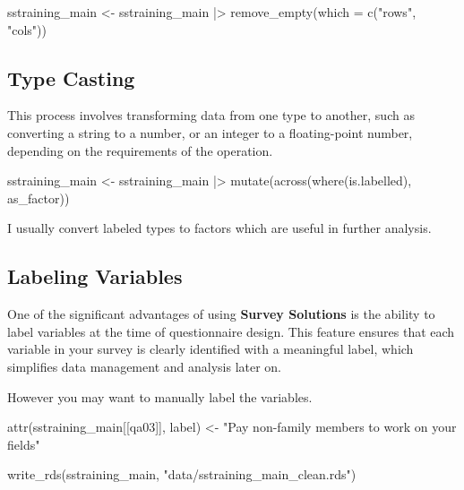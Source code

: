 \documentclass[
  letterpaper,
  DIV=11,
  numbers=noendperiod]{scrreprt}
\newenvironment{Shaded}{\begin{snugshade}}{\end{snugshade}}
\newcommand{\AttributeTok}[1]{\textcolor[rgb]{0.40,0.45,0.13}{#1}}
\newcommand{\FunctionTok}[1]{\textcolor[rgb]{0.28,0.35,0.67}{#1}}
\newcommand{\NormalTok}[1]{\textcolor[rgb]{0.00,0.23,0.31}{#1}}
\newcommand{\OtherTok}[1]{\textcolor[rgb]{0.00,0.23,0.31}{#1}}
\newcommand{\SpecialCharTok}[1]{\textcolor[rgb]{0.37,0.37,0.37}{#1}}
\newcommand{\StringTok}[1]{\textcolor[rgb]{0.13,0.47,0.30}{#1}}
\begin{document}
\begin{Shaded}
\begin{Highlighting}[]
\NormalTok{sstraining\_main }\OtherTok{\textless{}{-}}\NormalTok{ sstraining\_main }\SpecialCharTok{|\textgreater{}} 
  \FunctionTok{remove\_empty}\NormalTok{(}\AttributeTok{which =} \FunctionTok{c}\NormalTok{(}\StringTok{"rows"}\NormalTok{, }\StringTok{"cols"}\NormalTok{))}
\end{Highlighting}
\end{Shaded}

\subsection{Type Casting}\label{type-casting}

This process involves transforming data from one type to another, such
as converting a string to a number, or an integer to a floating-point
number, depending on the requirements of the operation.

\begin{Shaded}
\begin{Highlighting}[]
\NormalTok{sstraining\_main }\OtherTok{\textless{}{-}}\NormalTok{ sstraining\_main }\SpecialCharTok{|\textgreater{}} 
  \FunctionTok{mutate}\NormalTok{(}\FunctionTok{across}\NormalTok{(}\FunctionTok{where}\NormalTok{(is.labelled), as\_factor))}
\end{Highlighting}
\end{Shaded}

I usually convert labeled types to factors which are useful in further
analysis.

\subsection{Labeling Variables}\label{labeling-variables}

One of the significant advantages of using \textbf{Survey Solutions} is
the ability to label variables at the time of questionnaire design. This
feature ensures that each variable in your survey is clearly identified
with a meaningful label, which simplifies data management and analysis
later on.

However you may want to manually label the variables.

\begin{Shaded}
\begin{Highlighting}[]
\FunctionTok{attr}\NormalTok{(sstraining\_main[[}\StringTok{\textquotesingle{}qa03\textquotesingle{}}\NormalTok{]], }\StringTok{\textquotesingle{}label\textquotesingle{}}\NormalTok{) }\OtherTok{\textless{}{-}} \StringTok{"Pay non{-}family members to work on your fields"}

\FunctionTok{write\_rds}\NormalTok{(sstraining\_main, }\StringTok{"data/sstraining\_main\_clean.rds"}\NormalTok{)}
\end{Highlighting}
\end{Shaded}
\end{document}
